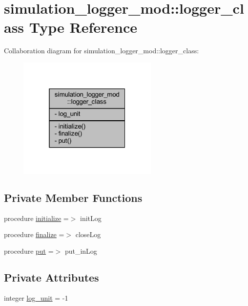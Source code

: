 \hypertarget{structsimulation__logger__mod_1_1logger__class}{}\section{simulation\+\_\+logger\+\_\+mod\+:\+:logger\+\_\+class Type Reference}
\label{structsimulation__logger__mod_1_1logger__class}


Collaboration diagram for simulation\+\_\+logger\+\_\+mod\+:\+:logger\+\_\+class\+:
\nopagebreak
\begin{figure}[H]
\begin{center}
\leavevmode
\includegraphics[width=196pt]{structsimulation__logger__mod_1_1logger__class__coll__graph}
\end{center}
\end{figure}
\subsection*{Private Member Functions}
\begin{DoxyCompactItemize}
\item 
procedure \mbox{\hyperlink{structsimulation__logger__mod_1_1logger__class_ade4c1c34641ac20778c7d4f1e2e1cd81}{initialize}} =$>$ init\+Log
\item 
procedure \mbox{\hyperlink{structsimulation__logger__mod_1_1logger__class_a46fc11fd1e42d174205e06a05c223489}{finalize}} =$>$ close\+Log
\item 
procedure \mbox{\hyperlink{structsimulation__logger__mod_1_1logger__class_ae99085dc817bbb52855ab4bbd71d1a57}{put}} =$>$ put\+\_\+in\+Log
\end{DoxyCompactItemize}
\subsection*{Private Attributes}
\begin{DoxyCompactItemize}
\item 
integer \mbox{\hyperlink{structsimulation__logger__mod_1_1logger__class_a6b7412c0a809c5c2e63edd967d1d2f11}{log\+\_\+unit}} = -\/1
\end{DoxyCompactItemize}


